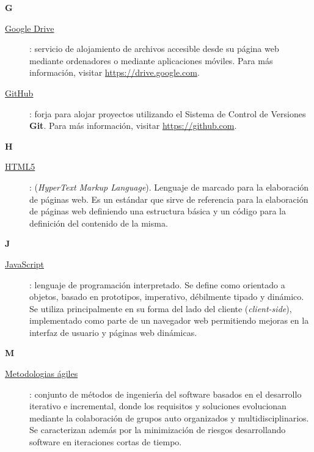 {\bfseries {\Huge G}}\label{Apendice1:G}
\bigskip
\bigskip

\begin{description}
  \item[\underline{Google Drive}\label{apend1:drive}]: servicio de alojamiento de archivos accesible desde su p\'agina web mediante ordenadores o mediante aplicaciones m\'oviles. Para m\'as 
  informaci\'on, visitar {\small \url{https://drive.google.com}}.
  \bigskip
\end{description}

\begin{description}
  \item[\underline{GitHub}\label{apend1:github}]: forja para alojar proyectos utilizando el Sistema de Control de Versiones {\bfseries Git}. Para m\'as informaci\'on, visitar {\small 
  \url{https://github.com}}.
  \bigskip
\end{description}

\bigskip
{\bfseries {\Huge H}}\label{Apendice1:H}
\bigskip
\bigskip

\begin{description}
  \item[\underline{HTML5}\label{apend1:html}]: (\textit{HyperText Markup Language}). Lenguaje de marcado para la elaboraci\'on de p\'aginas web. Es un est\'andar que sirve de referencia para la 
  elaboraci\'on de p\'aginas web definiendo una estructura b\'asica y un c\'odigo para la definici\'on del contenido de la misma.
  \bigskip
\end{description}

\bigskip
\newpage

{\bfseries {\Huge J}}\label{Apendice1:J}
\bigskip
\bigskip

\begin{description}
  \item[\underline{JavaScript}\label{apend1:js}]: lenguaje de programaci\'on interpretado. Se define como orientado a objetos, basado en prototipos, imperativo, d\'ebilmente tipado y 
  din\'amico. Se utiliza principalmente en su forma del lado del cliente (\textit{client-side}), implementado como parte de un navegador web permitiendo mejoras en la interfaz de usuario y p\'aginas 
web din\'amicas.
  \bigskip
\end{description}

\bigskip
{\bfseries {\Huge M}}\label{Apendice1:M}
\bigskip
\bigskip

\begin{description}
  \item[\underline{Metodologias \'agiles}\label{apend1:ma}]: conjunto de m\'etodos de ingenier\'{\i}a del software basados en el desarrollo iterativo e incremental, donde los requisitos y 
  soluciones evolucionan mediante la colaboraci\'on de grupos auto organizados y multidisciplinarios. Se caracterizan adem\'as por la minimizaci\'on de riesgos desarrollando software en
  iteraciones cortas de tiempo.
  \bigskip
\end{description}

